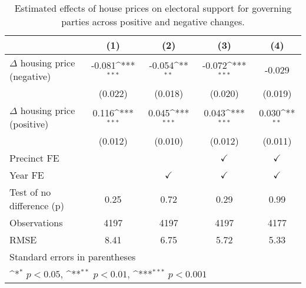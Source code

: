 \begin{table}[htbp]\centering
\def\sym#1{\ifmmode^{#1}\else\(^{#1}\)\fi}
\caption{Estimated effects of house prices on electoral support for governing parties across positive and negative changes.} \label{preposneg}
\begin{tabular}{l*{4}{c}}
\hline\hline
                    &\multicolumn{1}{c}{(1)}         &\multicolumn{1}{c}{(2)}         &\multicolumn{1}{c}{(3)}         &\multicolumn{1}{c}{(4)}         \\
\hline
$\Delta$ housing price (negative)&      -0.081\sym{***}&      -0.054\sym{**} &      -0.072\sym{***}&      -0.029         \\
                    &     (0.022)         &     (0.018)         &     (0.020)         &     (0.019)         \\
[1em]
$\Delta$ housing price (positive)&       0.116\sym{***}&       0.045\sym{***}&       0.043\sym{***}&       0.030\sym{**} \\
                    &     (0.012)         &     (0.010)         &     (0.012)         &     (0.011)         \\
[1em]
\hline Precinct FE  &                     &                     &$\checkmark$         &$\checkmark$         \\
[1em]
Year FE             &                     &$\checkmark$         &$\checkmark$         &$\checkmark$         \\
\hline
Test of no difference (p)&        0.25         &        0.72         &        0.29         &        0.99         \\
Observations        &        4197         &        4197         &        4197         &        4177         \\
RMSE                &        8.41         &        6.75         &        5.72         &        5.33         \\
\hline\hline
\multicolumn{5}{l}{\footnotesize Standard errors in parentheses}\\
\multicolumn{5}{l}{\footnotesize \sym{*} \(p<0.05\), \sym{**} \(p<0.01\), \sym{***} \(p<0.001\)}\\
\end{tabular}
\end{table}
